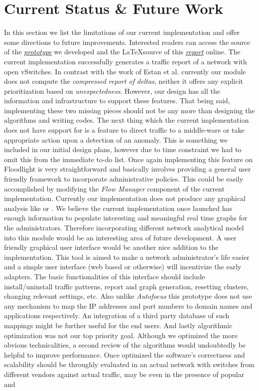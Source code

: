 \documentclass[twocolumn]{article}
\begin{document}
\section{Current Status \& Future Work}
\label{sec:futurework}
In this section we list the limitations of our current implementation and offer some directions to future improvements. Interested readers can access the source of the \href{https://github.com/bornogit/Floodlight-AD/blob/master/Source.rar}{\emph{prototype}} we developed and the \LaTeX source of this \href{https://github.com/bornogit/Floodlight-AD/blob/master/LaTeX-Report.rar}{\emph{report}} online. The current implementation successfully generates a traffic report of a network with open vSwitches. In contrast with the work of Estan et al. \cite{autofocus} currently our module does not compute the \emph{compressed report of deltas}, neither it offers any explicit prioritization based on \emph{unexpectedness}. However, our design has all the information and infrastructure to support these features. That being said, implementing these two missing pieces should not be any more than designing the algorithms and writing codes. The next thing which the current implementation does not have support for is a feature to direct traffic to a middle-ware or take appropriate action upon a detection of an anomaly. This is something we included in our initial design plans, however due to time constraint we had to omit this from the immediate to-do list. Once again implementing this feature on Floodlight is very straightforward and basically involves providing a general user friendly framework to incorporate administrative policies. This could be easily accomplished by modifying the \emph{Flow Manager} component of the current implementation. Currently our implementation does not produce any graphical analysis like \cite{autofocus} or \cite{flowscan}. We believe the current implementation once launched has enough information to populate interesting and meaningful real time graphs for the administrators. Therefore incorporating different network analytical model into this module would be an interesting area of future development. A user friendly graphical user interface would be another nice addition to the implementation. This tool is aimed to make a network administrator\rq{}s life easier and a simple user interface (web based or otherwise) will incentivize the early adapters. The basic functionalities of this interface should include install/uninstall traffic patterns, report and graph generation, resetting clusters, changing relevant settings, etc.  Also unlike \emph{Autofocus} this prototype does not use any mechanism to map the IP addresses and port numbers to domain names and applications respectively. An integration of a third party database of such mappings might be further useful for the end users. And lastly algorithmic optimization was not our top priority goal. Although we optimized the more obvious technicalities, a second review of the algorithms would undoubtedly be helpful to improve performance. Once optimized the software\rq{}s correctness and scalability should be throughly evaluated in an actual network with switches from different vendors against actual traffic, may be even in the presence of popular and 
\end{document}

